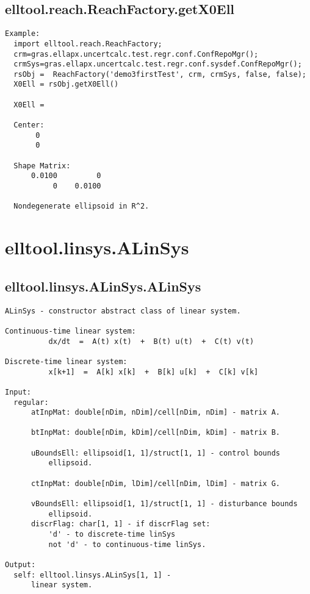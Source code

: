 \subsection{\texorpdfstring{elltool.reach.ReachFactory.getX0Ell}{getX0Ell}}\label{method:elltool.reach.ReachFactory.getX0Ell}
\begin{verbatim}
Example:
  import elltool.reach.ReachFactory;
  crm=gras.ellapx.uncertcalc.test.regr.conf.ConfRepoMgr();
  crmSys=gras.ellapx.uncertcalc.test.regr.conf.sysdef.ConfRepoMgr();
  rsObj =  ReachFactory('demo3firstTest', crm, crmSys, false, false);
  X0Ell = rsObj.getX0Ell()

  X0Ell =

  Center:
       0
       0

  Shape Matrix:
      0.0100         0
           0    0.0100

  Nondegenerate ellipsoid in R^2.
\end{verbatim}
\section{elltool.linsys.ALinSys}\label{secClassDescr:elltool.linsys.ALinSys}
\subsection{\texorpdfstring{elltool.linsys.ALinSys.ALinSys}{ALinSys}}\label{method:elltool.linsys.ALinSys.ALinSys}
\begin{verbatim}
ALinSys - constructor abstract class of linear system.

Continuous-time linear system:
          dx/dt  =  A(t) x(t)  +  B(t) u(t)  +  C(t) v(t)

Discrete-time linear system:
          x[k+1]  =  A[k] x[k]  +  B[k] u[k]  +  C[k] v[k]

Input:
  regular:
      atInpMat: double[nDim, nDim]/cell[nDim, nDim] - matrix A.

      btInpMat: double[nDim, kDim]/cell[nDim, kDim] - matrix B.

      uBoundsEll: ellipsoid[1, 1]/struct[1, 1] - control bounds
          ellipsoid.

      ctInpMat: double[nDim, lDim]/cell[nDim, lDim] - matrix G.

      vBoundsEll: ellipsoid[1, 1]/struct[1, 1] - disturbance bounds
          ellipsoid.
      discrFlag: char[1, 1] - if discrFlag set:
          'd' - to discrete-time linSys
          not 'd' - to continuous-time linSys.

Output:
  self: elltool.linsys.ALinSys[1, 1] -
      linear system.
\end{verbatim}
